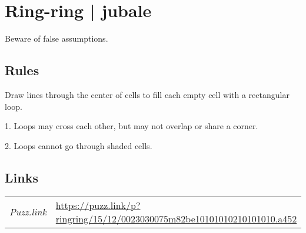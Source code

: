 \section{Ring-ring | {\normalfont jubale}}
\label{sec:26-ring-ring-jubale}
Beware of false assumptions.
\subsection*{Rules}
\begin{markdown}
Draw lines through the center of cells to fill each empty cell with a rectangular loop.



1. Loops may cross each other, but may not overlap or share a corner.

2. Loops cannot go through shaded cells.
\end{markdown}
\subsection*{Links}
\begin{tabularx}{\textwidth}{l X}
\emph{Puzz.link} & \url{https://puzz.link/p?ringring/15/12/0023030075m82be10101010210101010.a452} \\
\end{tabularx}
\pagebreak
